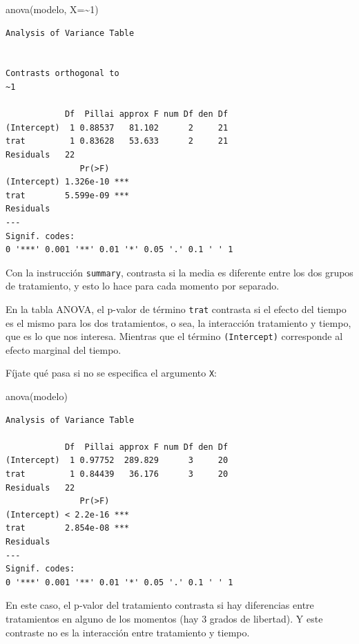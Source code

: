 \documentclass[
]{book}
\newenvironment{Shaded}{\begin{snugshade}}{\end{snugshade}}
\newcommand{\AttributeTok}[1]{\textcolor[rgb]{0.77,0.63,0.00}{#1}}
\newcommand{\DecValTok}[1]{\textcolor[rgb]{0.00,0.00,0.81}{#1}}
\newcommand{\FunctionTok}[1]{\textcolor[rgb]{0.00,0.00,0.00}{#1}}
\newcommand{\NormalTok}[1]{#1}
\newcommand{\SpecialCharTok}[1]{\textcolor[rgb]{0.00,0.00,0.00}{#1}}
\begin{document}
\begin{Shaded}
\begin{Highlighting}[]
\FunctionTok{anova}\NormalTok{(modelo, }\AttributeTok{X=}\SpecialCharTok{\textasciitilde{}}\DecValTok{1}\NormalTok{)}
\end{Highlighting}
\end{Shaded}

\begin{verbatim}
Analysis of Variance Table


Contrasts orthogonal to
~1

            Df  Pillai approx F num Df den Df
(Intercept)  1 0.88537   81.102      2     21
trat         1 0.83628   53.633      2     21
Residuals   22                               
               Pr(>F)    
(Intercept) 1.326e-10 ***
trat        5.599e-09 ***
Residuals                
---
Signif. codes:  
0 '***' 0.001 '**' 0.01 '*' 0.05 '.' 0.1 ' ' 1
\end{verbatim}

Con la instrucción \texttt{summary}, contrasta si la media es diferente entre los dos grupos de tratamiento, y esto lo hace para cada momento por separado.

En la tabla ANOVA, el p-valor de término \texttt{trat} contrasta si el efecto del tiempo es el mismo para los dos tratamientos, o sea, la interacción tratamiento y tiempo, que es lo que nos interesa. Mientras que el término \texttt{(Intercept)} corresponde al efecto marginal del tiempo.

Fíjate qué pasa si no se especifica el argumento \texttt{X}:

\begin{Shaded}
\begin{Highlighting}[]
\FunctionTok{anova}\NormalTok{(modelo)}
\end{Highlighting}
\end{Shaded}

\begin{verbatim}
Analysis of Variance Table

            Df  Pillai approx F num Df den Df
(Intercept)  1 0.97752  289.829      3     20
trat         1 0.84439   36.176      3     20
Residuals   22                               
               Pr(>F)    
(Intercept) < 2.2e-16 ***
trat        2.854e-08 ***
Residuals                
---
Signif. codes:  
0 '***' 0.001 '**' 0.01 '*' 0.05 '.' 0.1 ' ' 1
\end{verbatim}

En este caso, el p-valor del tratamiento contrasta si hay diferencias entre tratamientos en alguno de los momentos (hay 3 grados de libertad). Y este contraste no es la interacción entre tratamiento y tiempo.
\end{document}
